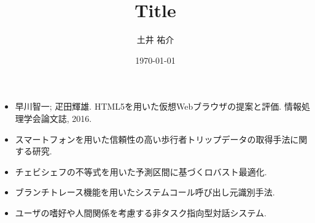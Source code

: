 \documentclass[dvipdfmx,8pt]{beamer}
\title{Title}
\author{土井 祐介}
\institute{Kaori Lab., Kyushu Institute of Technology}
\date{\today}
\begin{document}
\frame[plain]{
  \titlepage
}
\addtocounter{framenumber}{-1}
\begin{frame}
  \begin{itemize}
    \item 早川智一; 疋田輝雄. HTML5を用いた仮想Webブラウザの提案と評価. 情報処理学会論文誌, 2016. \cite{weko_148195_1}
    \item スマートフォンを用いた信頼性の高い歩行者トリップデータの取得手法に関する研究. \cite{2016d}
    \item チェビシェフの不等式を用いた予測区間に基づくロバスト最適化. \cite{weko_157917_1}
    \item ブランチトレース機能を用いたシステムコール呼び出し元識別手法. \cite{weko_148217_1}
    \item ユーザの嗜好や人間関係を考慮する非タスク指向型対話システム. \cite{2016g}
  \end{itemize}

	
	
\end{frame}

\end{document}
